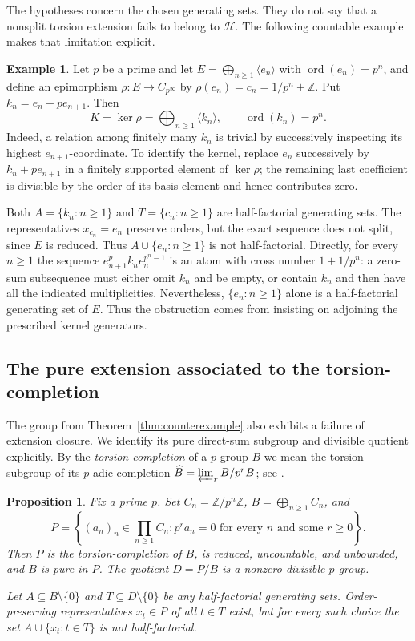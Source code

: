 \documentclass[11pt,reqno]{amsart}
\numberwithin{equation}{section}
\newtheorem{proposition}[theorem]{Proposition}
\theoremstyle{definition}
\newtheorem{example}[theorem]{Example}
\theoremstyle{remark}
\newcommand{\Z}{\mathbb Z}
\newcommand{\HF}{\mathcal H}
\DeclareMathOperator{\ord}{ord}
\begin{document}
The hypotheses concern the chosen generating sets. They do not say
that a nonsplit torsion extension fails to belong to $\HF$.
The following countable example makes that limitation explicit.

\begin{example}\label{ex:positive-nonsplit}
Let $p$ be a prime and let $E=\bigoplus_{n\ge1}\langle e_n\rangle$ with
$\ord(e_n)=p^n$, and define an epimorphism
$\rho:E\to C_{p^\infty}$ by
$\rho(e_n)=c_n=1/p^n+\Z$. Put $k_n=e_n-pe_{n+1}$.
Then
\[
 K=\ker\rho=\bigoplus_{n\ge1}\langle k_n\rangle,
 \qquad \ord(k_n)=p^n.
\]
Indeed, a relation among finitely many $k_n$ is trivial by
successively inspecting its highest $e_{n+1}$-coordinate. To
identify the kernel, replace $e_n$ successively by
$k_n+pe_{n+1}$ in a finitely supported element of $\ker\rho$;
the remaining last coefficient is divisible by the order of its
basis element and hence contributes zero.

Both $A=\{k_n:n\ge1\}$ and $T=\{c_n:n\ge1\}$ are
half-factorial generating sets. The representatives $x_{c_n}=e_n$
preserve orders, but the exact sequence does not split, since
$E$ is reduced. Thus $A\cup\{e_n:n\ge1\}$ is not
half-factorial. Directly, for every $n\ge1$ the sequence
$e_{n+1}^{p}k_ne_n^{p^n-1}$ is an atom with cross number
$1+1/p^n$: a zero-sum subsequence must either omit $k_n$ and be
empty, or contain $k_n$ and then have all the indicated
multiplicities. Nevertheless, $\{e_n:n\ge1\}$ alone is a
half-factorial generating set of $E$. Thus the obstruction comes
from insisting on adjoining the prescribed kernel generators.
\end{example}

\subsection{The pure extension associated to the torsion-completion}

The group from Theorem~\ref{thm:counterexample} also exhibits a
failure of extension closure. We identify its pure direct-sum
subgroup and divisible quotient explicitly. By the
\emph{torsion-completion} of a $p$-group $B$ we mean the torsion
subgroup of its $p$-adic completion
$\widehat B=\varprojlim_r B/p^rB$; see \cite{FuchsII}.

\begin{proposition}\label{prop:completion}
Fix a prime $p$. Set $C_n=\Z/p^n\Z$,
$B=\bigoplus_{n\ge1}C_n$, and
\begin{equation}\label{eq:completion}
 P=\left\{(a_n)_n\in\prod_{n\ge1}C_n:
       p^r a_n=0\text{ for every }n\text{ and some }r\ge0\right\}.
\end{equation}
Then $P$ is the torsion-completion of $B$, is reduced, uncountable,
and unbounded, and $B$ is pure in $P$. The quotient $D=P/B$ is a
nonzero divisible $p$-group.

Let $A\subseteq B\setminus\{0\}$ and
$T\subseteq D\setminus\{0\}$ be any half-factorial generating
sets. Order-preserving representatives $x_t\in P$ of all $t\in T$
exist, but for every such choice the set
$A\cup\{x_t:t\in T\}$ is not half-factorial.
\end{proposition}
\end{document}
